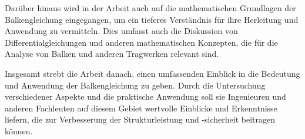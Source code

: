 Darüber hinaus wird in der Arbeit auch auf die mathematischen Grundlagen der Balkengleichung eingegangen, um ein tieferes Verständnis für ihre Herleitung und Anwendung zu vermitteln.
Dies umfasst auch die Diskussion von Differentialgleichungen und anderen mathematischen Konzepten, die für die Analyse von Balken und anderen Tragwerken relevant sind.

Insgesamt strebt die Arbeit danach, einen umfassenden Einblick in die Bedeutung und Anwendung der Balkengleichung zu geben. 
Durch die Untersuchung verschiedener Aspekte und die praktische Anwendung soll sie Ingenieuren und anderen Fachleuten auf diesem Gebiet wertvolle Einblicke und Erkenntnisse liefern, die zur Verbesserung der Strukturleistung und -sicherheit beitragen können.
